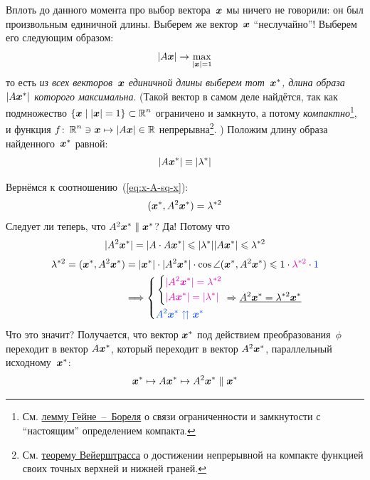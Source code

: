 \documentclass[a4paper,12pt]{article}
\theoremstyle{remark}
\begin{document}
  Вплоть до данного момента про выбор вектора~$\boldsymbol x$ мы ничего не говорили: он был произвольным единичной длины.
  Выберем же вектор~$\boldsymbol x$ ``неслучайно''!
  Выберем его следующим образом:
  \[
    |A \boldsymbol x| \to \max_{|\boldsymbol x| = 1}
  \]
  то есть \emph{из всех векторов~$\boldsymbol x$ единичной длины выберем тот~$\boldsymbol x^*$, длина образа $|A \boldsymbol x^*|$ которого максимальна}.
  (Такой вектор в самом деле найдётся, так как подмножество $\{\bds x \hm\mid |\bds x| \hm= 1\} \hm\subset \RR^n$ ограничено и замкнуто, а потому \emph{компактно}\footnote{См. \href{https://mipt.ru/education/chair/mathematics/upload/0a5/balashov\_mv\_1.pdf}{лемму Гейне~--~Бореля} о связи ограниченности и замкнутости с ``настоящим'' определением компакта.}, и функция $f\colon \RR^n \hm\ni \bds x \hm\mapsto |A \bds x| \hm\in \RR$ непрерывна\footnote{См. \href{https://en.wikipedia.org/wiki/Extreme\_value\_theorem}{теорему Вейерштрасса} о достижении непрерывной на компакте функцией своих точных верхней и нижней граней.}.
  )
  Положим длину образа найденного~$\boldsymbol x^*$ равной:
  \[
    |A \boldsymbol x^*| \equiv |\lambda^*|
  \]
  
  Вернёмся к соотношению~(\ref{eq:x-A-sq-x}):
  \[
    (\boldsymbol x^*, A^2 \boldsymbol x^*) = \lambda^{*2}
  \]
  Следует ли теперь, что $A^2 \bds x^* \hm\parallel \bds x^*$?
  Да!
  Потому что
  \[
    |A^2 \boldsymbol x^*| = |A \cdot A \boldsymbol x^*| \leqslant |\lambda^*| |A \boldsymbol x^*| \leqslant \lambda^{*2}
  \]
  \begin{equation}
  \begin{split}
    \lambda^{*2} = (\bds x^*, A^2 \bds x^*) &= |\bds x^*| \cdot |A^2 \bds x^*| \cdot \cos\angle (\bds x^*, A^2 \bds x^*) \leq 1 \cdot \textcolor{pink}{\lambda^{*2}} \cdot \textcolor{blue}{1}\\
    &\Longrightarrow \left\{
      \begin{aligned}
        &\left\{
          \begin{aligned}
            &\textcolor{pink}{|A^2 \bds x^*| = \lambda^{*2}}\\
            &\textcolor{pink}{|A \bds x^*| = |\lambda^*|}
          \end{aligned}
        \right.\\
        &\textcolor{blue}{A^2 \bds x^* \hm\upuparrows \bds x^*}
      \end{aligned}
    \right.
    \Rightarrow \underline{A^2 \bds x^* = \lambda^{*2} \bds x^*}
  \end{split}
  \end{equation}
  Что это значит?
  Получается, что вектор $\boldsymbol x^*$ под действием преобразования~$\phi$ переходит в вектор $A \boldsymbol x^*$, который переходит в вектор $A^2 \boldsymbol x^*$, параллельный исходному~$\boldsymbol x^*$:
  \[
    \boldsymbol x^* \mapsto A \boldsymbol x^* \mapsto A^2 \boldsymbol x^* \parallel \boldsymbol x^*
  \]
  
\end{document}
